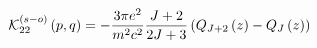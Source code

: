 \begin{equation}
\mathcal{K}_{22}^{\left( s-o\right) }\left( p,q\right) =-\frac{3\pi e^{2}}{%
m^{2}c^{2}}\frac{J+2}{2J+3}\left( Q_{J+2}\left( z\right) -Q_{J}\left(
z\right) \right)
\end{equation}

